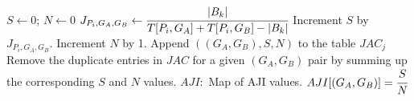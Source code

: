 \documentclass{article}[11pt]
\begin{document}
\begin{algorithm}[H]
\begin{algorithmic}[1]
            \State $S \gets 0$; $N \gets 0$
                   \State $J_{P_i, G_A, G_B}\gets\cfrac{|B_k|}{T[P_i, G_A] + T[P_i, G_B] - |B_k|}$
                   \State Increment $S$ by $J_{P_i, G_A, G_B}$.
                   \State Increment $N$ by 1.
            \EndFor
            \State Append $((G_A, G_B), S, N)$ to the table $JAC_j$ 
        \EndFor
        \State \label{jacendTetramer} Remove the duplicate entries in $JAC$ for a given $(G_A, G_B)$ pair by summing up the corresponding $S$ and $N$ values.
        \State \label{ajibeginTetramer} $AJI :$ Map of AJI values.
            \State $AJI[(G_A, G_B)] = \cfrac{S}{N}$
        \EndFor \label{ajiendTetramer}
    \EndFunction
\end{algorithmic}
\end{algorithm}
\end{document}
